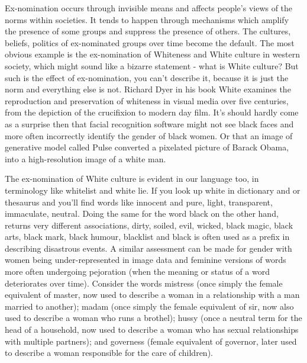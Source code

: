 Ex-nomination occurs through invisible means and affects people's views of the norms within societies. It tends to happen through mechanisms which amplify the presence of some groups and suppress the presence of others. The cultures, beliefs, politics of ex-nominated groups over time become the default. The most obvious example is the ex-nomination of Whiteness and White culture in western society, which might sound like a bizarre statement - what is White culture? But such is the effect of ex-nomination, you can't describe it, because it is just the norm and everything else is not. Richard Dyer in his book White examines the reproduction and preservation of whiteness in visual media over five centuries, from the depiction of the crucifixion to modern day film. It's should hardly come as a surprise then that facial recognition software might not see black faces and more often incorrectly identify the gender of black women. Or that an image of generative model called Pulse converted a pixelated picture of Barack Obama, into a high-resolution image of a white man.

The ex-nomination of White culture is evident in our language too, in terminology like whitelist and white lie. If you look up white in dictionary and or thesaurus and you'll find words like innocent and pure, light, transparent, immaculate, neutral. Doing the same for the word black on the other hand, returns very different associations, dirty, soiled, evil, wicked, black magic, black arts, black mark, black humour, blacklist and black is often used as a prefix in describing disastrous events. A similar assessment can be made for gender with women being under-represented in image data and feminine versions of words more often undergoing pejoration (when the meaning or status of a word deteriorates over time). Consider the words mistress (once simply the female equivalent of master, now used to describe a woman in a relationship with a man married to another); madam (once simply the female equivalent of sir, now also used to describe a woman who runs a brothel); hussy (once a neutral term for the head of a household, now used to describe a woman who has sexual relationships with multiple partners); and governess (female equivalent of governor, later used to describe a woman responsible for the care of children).

